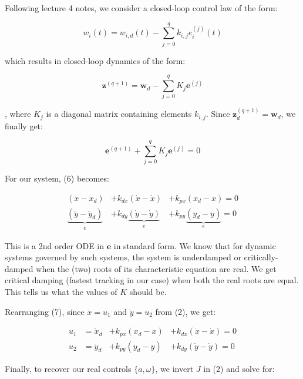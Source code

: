 \documentclass{article}
\begin{document}
\begin{enumerate}[label=(\roman*)]
	Following lecture 4 notes, we consider a closed-loop control law of the form:
	
	\begin{equation}
	w_i(t) = w_{i,d}(t) - \sum_{j=0}^q k_{i,j}e_i^{(j)}(t)
	\end{equation}
	
	which results in closed-loop dynamics of the form:
	
	\begin{equation}
	\bm{z}^{(q+1)} = \bm{w}_d - \sum_{j=0}^q K_j \bm{e}^{(j)}
	\end{equation}
	
	, where $K_j$ is a diagonal matrix containing elements $k_{i,j}$. Since $\bm{z}_d^{(q+1)}=\bm{w}_d$, we finally get:
	
	\begin{equation}
	\bm{e}^{(q+1)} + \sum_{j=0}^q K_j \bm{e}^{(j)} = 0
	\end{equation}
	
	For our system, (6) becomes:
	
	\begin{equation}
	\begin{aligned}
	(\ddot{x}-\ddot{x}_d) &+ k_{dx}(\dot{x} - \dot{x}) &+ k_{px}(x_d - x) = 0 \\
	\underbrace{(\ddot{y}-\ddot{y}_d)}_{\ddot{e}} &+
	k_{dy}\underbrace{(\dot{y} - \dot{y})}_{\dot{e}} &+
	k_{py}\underbrace{(y_d - y)}_{e} = 0
	\end{aligned}
	\end{equation}
	
	This is a 2nd order ODE in $\bm{e}$ in standard form. We know that for dynamic systems governed by such systems, the system is underdamped or critically-damped when the (two) roots of its characteristic equation are real. We get critical damping (fastest tracking in our case) when both the real roots are equal. This tells us what the values of $K$ should be.
	
	Rearranging (7), since $\ddot{x}=u_1$ and $\ddot{y}=u_2$ from (2), we get:
	
	\begin{equation}
	\begin{aligned}
	u_1 &= \ddot{x}_d &+ k_{px}(x_d - x) &+ k_{dx}(\dot{x} - \dot{x}) = 0 \\
	u_2 &= \ddot{y}_d &+ k_{py}(y_d - y) &+ k_{dy}(\dot{y} - \dot{y}) = 0
	\end{aligned}
	\end{equation}
	
	Finally, to recover our real controls $\{a, \omega\}$, we invert $J$ in (2) and solve for:


\end{enumerate}
\end{document}
